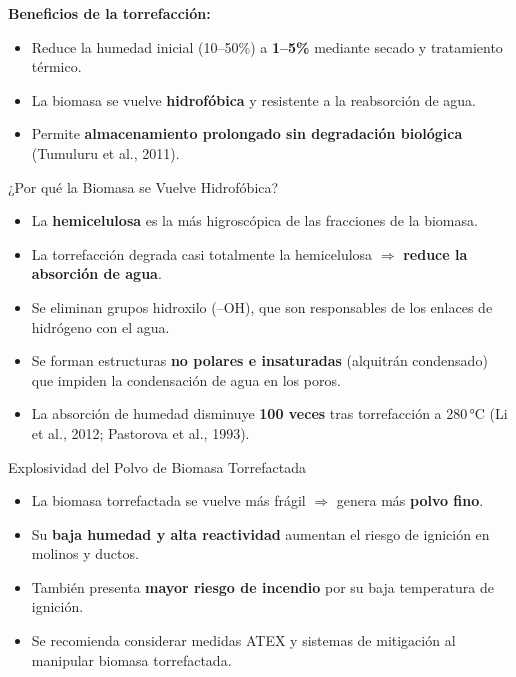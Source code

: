 \documentclass[main.tex]{subfiles}
\begin{document}
\begin{frame}
    \textbf{Beneficios de la torrefacción:}
\begin{itemize}
    \item Reduce la humedad inicial (10–50\%) a \textbf{1–5\%} mediante secado y tratamiento térmico.
    \item La biomasa se vuelve \textbf{hidrofóbica} y resistente a la reabsorción de agua.
    \item Permite \textbf{almacenamiento prolongado sin degradación biológica} (Tumuluru et al., 2011).
\end{itemize}
\end{frame}

\begin{frame}{¿Por qué la Biomasa se Vuelve Hidrofóbica?}
\small
\begin{itemize}
    \item La \textbf{hemicelulosa} es la más higroscópica de las fracciones de la biomasa.
    \item La torrefacción degrada casi totalmente la hemicelulosa $\Rightarrow$ \textbf{reduce la absorción de agua}.
    \item Se eliminan grupos hidroxilo (–OH), que son responsables de los enlaces de hidrógeno con el agua.
    \item Se forman estructuras \textbf{no polares e insaturadas} (alquitrán condensado) que impiden la condensación de agua en los poros.
    \item La absorción de humedad disminuye \textbf{100 veces} tras torrefacción a 280 °C (Li et al., 2012; Pastorova et al., 1993).
\end{itemize}
\end{frame}


\begin{frame}{Explosividad del Polvo de Biomasa Torrefactada}
\small
\begin{itemize}
    \item La biomasa torrefactada se vuelve más frágil $\Rightarrow$ genera más \textbf{polvo fino}.
    \item Su \textbf{baja humedad y alta reactividad} aumentan el riesgo de ignición en molinos y ductos.
    \item También presenta \textbf{mayor riesgo de incendio} por su baja temperatura de ignición.
    \item Se recomienda considerar medidas ATEX y sistemas de mitigación al manipular biomasa torrefactada.
\end{itemize}
\end{frame}
\end{document}
